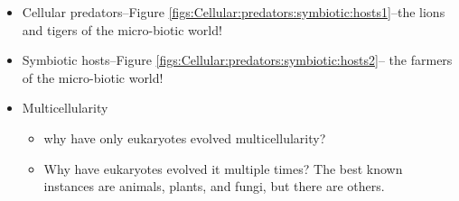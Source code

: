 \documentclass[]{article}
\begin{document}
\begin{itemize}
	\item Cellular predators--Figure \ref{figs:Cellular:predators:symbiotic:hosts1}--the lions and tigers of the micro-biotic world!
	\item Symbiotic hosts--Figure \ref{figs:Cellular:predators:symbiotic:hosts2}-- the farmers of the micro-biotic world!
	\item Multicellularity
	\begin{itemize}
		\item why have only eukaryotes evolved multicellularity?
		\item Why have eukaryotes evolved it multiple times? The best known instances are animals, plants, and fungi, but there are others.
	\end{itemize}
\end{itemize}
\end{document}
